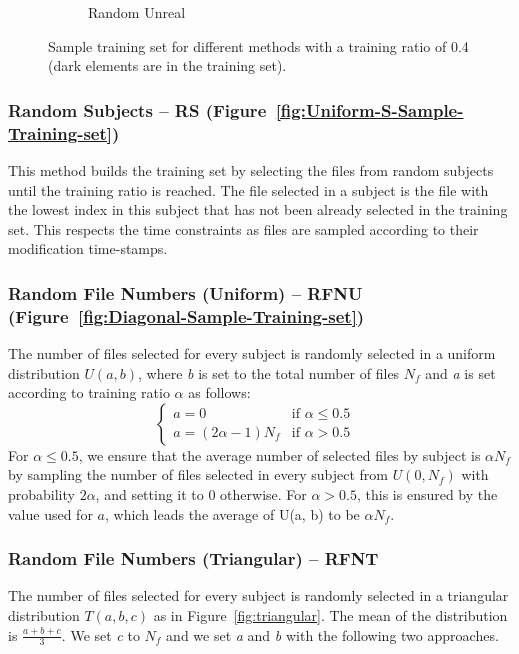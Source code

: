 \documentclass[10pt, conference, compsocconf]{IEEEtran}
\begin{document}
\begin{figure}[h!]
\begin{subfigure}[b]{\columnwidth}
                  \caption{Random Unreal}
                  \label{fig:Random-Unreal-Sample-Training-set}
        \end{subfigure}
        \caption{Sample training set for different methods with a training ratio of 0.4 (dark elements are in the training set).}
        \label{fig:sampling}
\end{figure}

\subsubsection{Random Subjects -- RS 
(Figure~\ref{fig:Uniform-S-Sample-Training-set})} This method builds 
the training set by selecting the files from random subjects until the 
training ratio is reached. The file selected in a subject is the file 
with the lowest index in this subject that has not been already 
selected in the training set. This respects the time constraints as files are 
sampled according to their modification time-stamps.

\subsubsection{Random File Numbers (Uniform) -- RFNU (Figure~\ref{fig:Diagonal-Sample-Training-set})}
The number of files selected for every subject is randomly selected in
a uniform distribution $U(\textit{a},\textit{b})$, where \textit{b} is set to the total
number of files $N_{f}$ and \textit{a} is set according to training ratio $\alpha$ as follows:
\[
  \begin{cases}
          \textit{a} = 0      & \text{if $\alpha \leq 0.5$ }\\
          
          \textit{a} = (2\alpha - 1) N_{f} & \text{if $\alpha > 0.5$}
  \end{cases}
\]
 For $\alpha \leq 0.5$, we ensure that the average number of selected 
 files by subject is $\alpha N_f$ by sampling the number of 
 files selected in every subject from $U(0,N_f)$ with 
 probability $2\alpha$, and setting it to 0 otherwise. For $\alpha > 
 0.5$, this is ensured by the value used for $a$, which leads the 
 average of U(a, b) to be $\alpha N_f$.

\subsubsection{Random File Numbers (Triangular) -- RFNT}
The number of files selected for every subject is randomly selected in
a triangular distribution $T(a, b, c)$ as in Figure~\ref{fig:triangular}. The mean of the distribution is 
$\frac{a+b+c}{3}$. We set \textit{c} to $N_{f}$ and we set 
\textit{a} and \textit{b} with the following two approaches.
\end{document}
